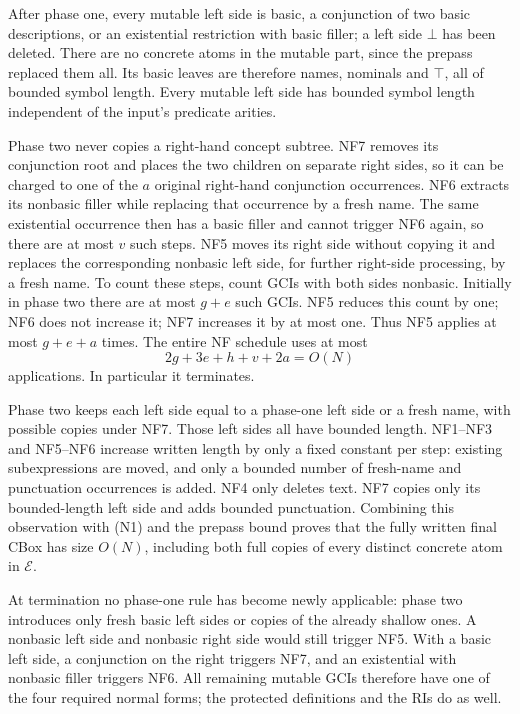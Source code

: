 After phase one, every mutable left side is basic, a conjunction of two
basic descriptions, or an existential restriction with basic filler;
a left side \(\bot\) has been deleted.
There are no concrete atoms in the mutable part, since the prepass
replaced them all.  Its basic leaves are therefore names, nominals and
\(\top\), all of bounded symbol length.  Every mutable left side has
bounded symbol length independent of the input's predicate arities.

Phase two never copies a right-hand concept subtree.
NF7 removes its conjunction root and places the two children on separate
right sides, so it can be charged to one of the \(a\) original right-hand
conjunction occurrences.
NF6 extracts its nonbasic filler while replacing that occurrence by a
fresh name.  The same existential occurrence then has a basic filler and
cannot trigger NF6 again, so there are at most \(v\) such steps.
NF5 moves its right side without copying it and replaces the corresponding
nonbasic left side, for further right-side processing, by a fresh name.
To count these steps, count GCIs with both sides nonbasic.  Initially in
phase two there are at most \(g+e\) such GCIs.
NF5 reduces this count by one; NF6 does not increase it; NF7 increases
it by at most one.
Thus NF5 applies at most \(g+e+a\) times.
The entire NF schedule uses at most
\[
 2g+3e+h+v+2a=O(N)
 \tag{N1}
\]
applications.  In particular it terminates.

Phase two keeps each left side equal to a phase-one left side or a fresh
name, with possible copies under NF7.  Those left sides all have bounded
length.  NF1--NF3 and NF5--NF6 increase written length by only a fixed
constant per step: existing subexpressions are moved, and only a bounded
number of fresh-name and punctuation occurrences is added.
NF4 only deletes text.  NF7 copies only its bounded-length left side and
adds bounded punctuation.  Combining this observation with (N1) and the
prepass bound proves that the fully written final CBox has size \(O(N)\),
including both full copies of every distinct concrete atom in \(\mathcal E\).

At termination no phase-one rule has become newly applicable: phase two
introduces only fresh basic left sides or copies of the already shallow
ones.  A nonbasic left side and nonbasic right side would still trigger
NF5.  With a basic left side, a conjunction on the right triggers NF7,
and an existential with nonbasic filler triggers NF6.
All remaining mutable GCIs therefore have one of the four required
normal forms; the protected definitions and the RIs do as well.

